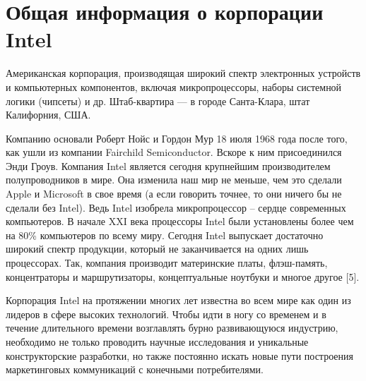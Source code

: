 \documentclass[a4paper,english,russian]{G2-105}
\begin{document}
\section{Общая информация о корпорации Intel}
\par Американская корпорация, производящая широкий спектр электронных устройств и компьютерных компонентов, включая микропроцессоры, наборы системной логики (чипсеты) и др. Штаб-квартира — в городе Санта-Клара, штат Калифорния, США.
\par Компанию основали Роберт Нойс и Гордон Мур 18 июля 1968 года после того, как ушли из компании Fairchild Semiconductor. Вскоре к ним присоединился Энди Гроув.
Компания Intel является сегодня крупнейшим производителем полупроводников в мире. Она изменила наш мир не меньше, чем это сделали Apple и Microsoft в свое время (а если говорить точнее, то они ничего бы не сделали без Intel). Ведь Intel изобрела микропроцессор – сердце современных компьютеров. В начале XXI века процессоры Intel были установлены более чем на 80\% компьютеров по всему миру. Сегодня Intel выпускает достаточно широкий спектр продукции, который не заканчивается на одних лишь процессорах. Так, компания производит материнские платы, флэш-память, концентраторы и маршрутизаторы, концептуальные ноутбуки и многое другое [5].
\par Корпорация Intel на протяжении многих лет известна во всем мире как один из лидеров в сфере высоких технологий. Чтобы идти в ногу со временем и в течение длительного времени возглавлять бурно развивающуюся индустрию, необходимо не только проводить научные исследования и уникальные конструкторские разработки, но также постоянно искать новые пути построения маркетинговых коммуникаций с конечными потребителями.
\end{document}
